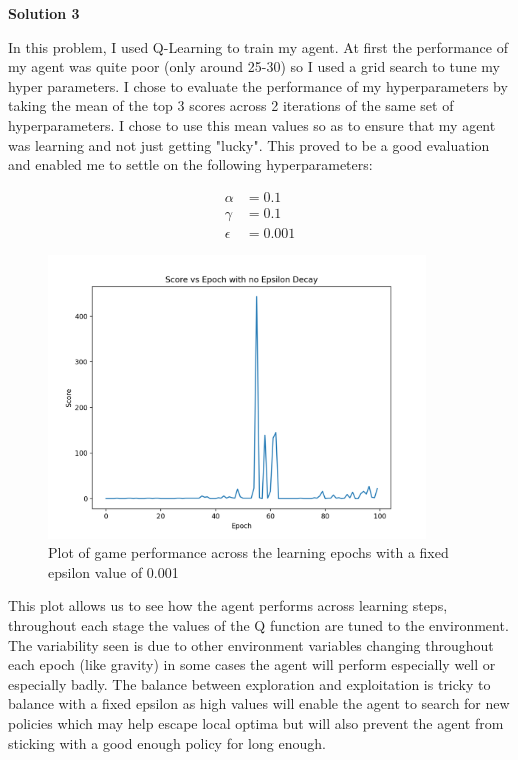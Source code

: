\documentclass[submit]{harvardml}
\begin{document}
\newpage
\textbf{Solution 3}

In this problem, I used Q-Learning to train my agent. At first the performance of my agent was quite poor (only around 25-30) so I used a grid search to tune my hyper parameters. I chose to evaluate the performance of my hyperparameters by taking the mean of the top 3 scores across 2 iterations of the same set of hyperparameters. I chose to use this mean values so as to ensure that my agent was learning and not just getting "lucky". This proved to be a good evaluation and enabled me to settle on the following hyperparameters:

\begin{align*}
    \alpha &= 0.1\\
    \gamma &= 0.1 \\
    \epsilon &= 0.001
\end{align*}

\begin{figure}[H]
    \includegraphics[width=10cm]{hw6/T6_P3/plots/p3_b.png}
    \centering
    \caption{Plot of game performance across the learning epochs with a fixed epsilon value of 0.001}
\end{figure}

This plot allows us to see how the agent performs across learning steps, throughout each stage the values of the Q function are tuned to the environment. The variability seen is due to other environment variables changing throughout each epoch (like gravity) in some cases the agent will perform especially well or especially badly. The balance between exploration and exploitation is tricky to balance with a fixed epsilon as high values will enable the agent to search for new policies which may help escape local optima but will also prevent the agent from sticking with a good enough policy for long enough.
\end{document}
